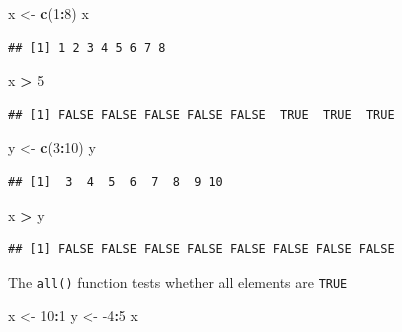 \documentclass[]{book}
\newenvironment{Shaded}{\begin{snugshade}}{\end{snugshade}}
\newcommand{\DecValTok}[1]{\textcolor[rgb]{0.00,0.00,0.81}{#1}}
\newcommand{\KeywordTok}[1]{\textcolor[rgb]{0.13,0.29,0.53}{\textbf{#1}}}
\newcommand{\NormalTok}[1]{#1}
\newcommand{\OperatorTok}[1]{\textcolor[rgb]{0.81,0.36,0.00}{\textbf{#1}}}
\newcommand{\StringTok}[1]{\textcolor[rgb]{0.31,0.60,0.02}{#1}}
\theoremstyle{definition}
\theoremstyle{definition}
\theoremstyle{definition}
\theoremstyle{remark}
\begin{document}
\begin{Shaded}
\begin{Highlighting}[]
\NormalTok{x <-}\StringTok{ }\KeywordTok{c}\NormalTok{(}\DecValTok{1}\OperatorTok{:}\DecValTok{8}\NormalTok{)}
\NormalTok{x}
\end{Highlighting}
\end{Shaded}

\begin{verbatim}
## [1] 1 2 3 4 5 6 7 8
\end{verbatim}

\begin{Shaded}
\begin{Highlighting}[]
\NormalTok{x }\OperatorTok{>}\StringTok{ }\DecValTok{5}
\end{Highlighting}
\end{Shaded}

\begin{verbatim}
## [1] FALSE FALSE FALSE FALSE FALSE  TRUE  TRUE  TRUE
\end{verbatim}

\begin{Shaded}
\begin{Highlighting}[]
\NormalTok{y <-}\StringTok{ }\KeywordTok{c}\NormalTok{(}\DecValTok{3}\OperatorTok{:}\DecValTok{10}\NormalTok{)}
\NormalTok{y}
\end{Highlighting}
\end{Shaded}

\begin{verbatim}
## [1]  3  4  5  6  7  8  9 10
\end{verbatim}

\begin{Shaded}
\begin{Highlighting}[]
\NormalTok{x }\OperatorTok{>}\StringTok{ }\NormalTok{y}
\end{Highlighting}
\end{Shaded}

\begin{verbatim}
## [1] FALSE FALSE FALSE FALSE FALSE FALSE FALSE FALSE
\end{verbatim}

The \texttt{all()} function tests whether all elements are \texttt{TRUE}

\begin{Shaded}
\begin{Highlighting}[]
\NormalTok{x <-}\StringTok{  }\DecValTok{10}\OperatorTok{:}\DecValTok{1}
\NormalTok{y <-}\StringTok{  }\DecValTok{-4}\OperatorTok{:}\DecValTok{5}
\NormalTok{x}
\end{Highlighting}
\end{Shaded}
\end{document}
